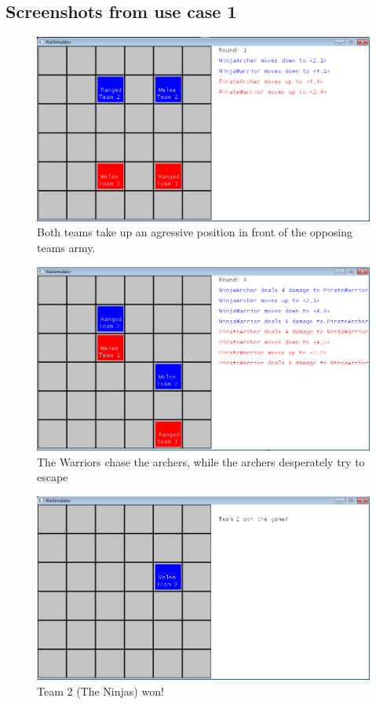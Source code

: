 	\subsection*{Screenshots from use case 1}
		\begin{figure}[H]
		\label{pic:case11}
			\center
			\includegraphics[scale=0.6]{rapport/7/figures/case1-1.png}
			\caption{Both teams take up an agressive position in front of the opposing teams army.}
		\end{figure}
		\begin{figure}[H]
		\label{pic:case12}
		\center
			\includegraphics[scale=0.6]{rapport/7/figures/case1-2.png}
			\caption{The Warriors chase the archers, while the archers desperately try to escape}
		\end{figure}
		\begin{figure}[H]
		\label{pic:case12}
		\center
			\includegraphics[scale=0.6]{rapport/7/figures/case1-3.png}
			\caption{Team 2 (The Ninjas) won!}
		\end{figure}
		
